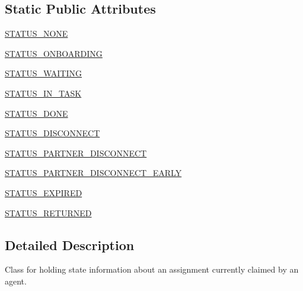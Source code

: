 \subsection*{Static Public Attributes}
\begin{DoxyCompactItemize}
\item 
\hyperlink{classparlai_1_1mturk_1_1core_1_1legacy__2018_1_1agents_1_1AssignState_ac8e290f949a6910c556594e4c2656f7f}{S\+T\+A\+T\+U\+S\+\_\+\+N\+O\+NE}
\item 
\hyperlink{classparlai_1_1mturk_1_1core_1_1legacy__2018_1_1agents_1_1AssignState_acd7121194526ae255f9f013994c35bdc}{S\+T\+A\+T\+U\+S\+\_\+\+O\+N\+B\+O\+A\+R\+D\+I\+NG}
\item 
\hyperlink{classparlai_1_1mturk_1_1core_1_1legacy__2018_1_1agents_1_1AssignState_ab58c745af8c0acfaa9f43af0913fcdce}{S\+T\+A\+T\+U\+S\+\_\+\+W\+A\+I\+T\+I\+NG}
\item 
\hyperlink{classparlai_1_1mturk_1_1core_1_1legacy__2018_1_1agents_1_1AssignState_ae7f27d79260bde1f019002b37630ee22}{S\+T\+A\+T\+U\+S\+\_\+\+I\+N\+\_\+\+T\+A\+SK}
\item 
\hyperlink{classparlai_1_1mturk_1_1core_1_1legacy__2018_1_1agents_1_1AssignState_a842d2ca59c0e0a5e7f2e12d9f2009e77}{S\+T\+A\+T\+U\+S\+\_\+\+D\+O\+NE}
\item 
\hyperlink{classparlai_1_1mturk_1_1core_1_1legacy__2018_1_1agents_1_1AssignState_ad00eddcf1bd7e78acc8a354bfecc4faa}{S\+T\+A\+T\+U\+S\+\_\+\+D\+I\+S\+C\+O\+N\+N\+E\+CT}
\item 
\hyperlink{classparlai_1_1mturk_1_1core_1_1legacy__2018_1_1agents_1_1AssignState_a497cfa1c72f15883a47a74480ebaf9ae}{S\+T\+A\+T\+U\+S\+\_\+\+P\+A\+R\+T\+N\+E\+R\+\_\+\+D\+I\+S\+C\+O\+N\+N\+E\+CT}
\item 
\hyperlink{classparlai_1_1mturk_1_1core_1_1legacy__2018_1_1agents_1_1AssignState_a3a8e33a696d945622887eb15e6e6f747}{S\+T\+A\+T\+U\+S\+\_\+\+P\+A\+R\+T\+N\+E\+R\+\_\+\+D\+I\+S\+C\+O\+N\+N\+E\+C\+T\+\_\+\+E\+A\+R\+LY}
\item 
\hyperlink{classparlai_1_1mturk_1_1core_1_1legacy__2018_1_1agents_1_1AssignState_a331728aea66c5c0c419b9eefed5bc169}{S\+T\+A\+T\+U\+S\+\_\+\+E\+X\+P\+I\+R\+ED}
\item 
\hyperlink{classparlai_1_1mturk_1_1core_1_1legacy__2018_1_1agents_1_1AssignState_a338d523e23faccb805f6c9c32ce294d2}{S\+T\+A\+T\+U\+S\+\_\+\+R\+E\+T\+U\+R\+N\+ED}
\end{DoxyCompactItemize}


\subsection{Detailed Description}
\begin{DoxyVerb}Class for holding state information about an assignment currently claimed by an
agent.
\end{DoxyVerb}
 


